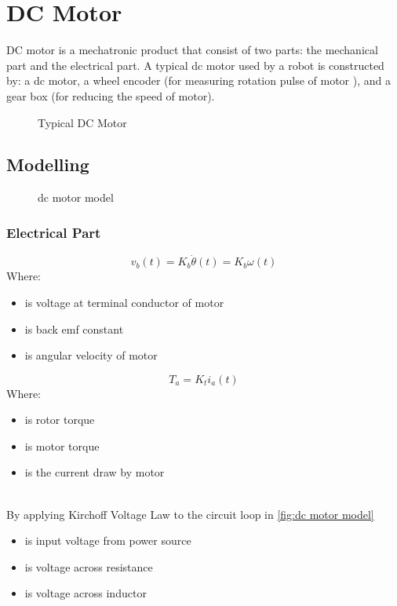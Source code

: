 \chapter{DC Motor}
DC motor is a mechatronic product that consist of two parts: the mechanical part and the electrical part. A typical dc motor used by a robot is constructed by: a dc motor, a wheel encoder (for measuring rotation pulse of motor ), and a gear box (for reducing the speed of motor).


\begin{figure}[h]
	\centering
	
	\caption{Typical DC Motor}
	\label{fig:dcmotor}
\end{figure}

\section{Modelling}

\begin{figure}[h]
	\centering
	
	\caption{dc motor model}
	\label{fig:dc motor model}
\end{figure}

\subsection{Electrical Part}
\begin{equation}
	v_b(t) = K_b \dot{\theta}(t) = K_b \omega(t)
	\label{dcmotoreq1}
\end{equation}
Where:
\begin{itemize}
	\item { is voltage at terminal conductor of motor }
	\item { is back emf constant}
	\item {\makebox[1cm]{\(\dot{\theta} = \omega\)\hfill} is angular velocity of motor}
\end{itemize}

\begin{equation}
	T_a = K_t i_a(t)
	\label{dcmotoreq2}
\end{equation}
Where:
\begin{itemize}
	\item { is rotor torque }
	\item { is motor torque}
	\item { is the current draw by motor}
\end{itemize}
\hfill\\
By applying Kirchoff Voltage Law to the circuit loop in \autoref{fig:dc motor model}
\begin{itemize}
	\item { is input voltage from power source}
	\item { is voltage across resistance}
	\item { is voltage across inductor}
\end{itemize}

